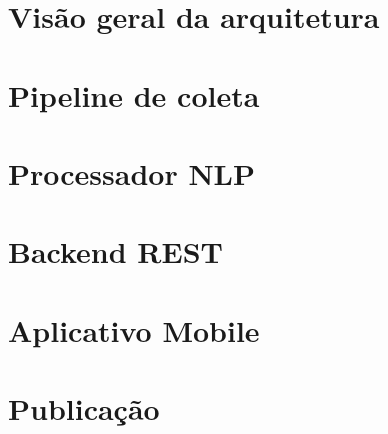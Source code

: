 %
%

\section{Visão geral da arquitetura}

\section{Pipeline de coleta}

\section{Processador NLP}

\section{Backend REST}

\section{Aplicativo Mobile}

\section{Publicação}
